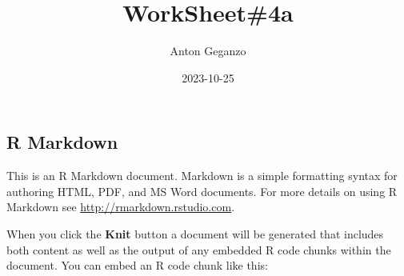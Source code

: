 \documentclass[
]{article}
\title{WorkSheet\#4a}
\author{Anton Geganzo}
\date{2023-10-25}
\begin{document}
\maketitle

\hypertarget{r-markdown}{%
\subsection{R Markdown}\label{r-markdown}}

This is an R Markdown document. Markdown is a simple formatting syntax
for authoring HTML, PDF, and MS Word documents. For more details on
using R Markdown see \url{http://rmarkdown.rstudio.com}.

When you click the \textbf{Knit} button a document will be generated
that includes both content as well as the output of any embedded R code
chunks within the document. You can embed an R code chunk like this:
\end{document}
